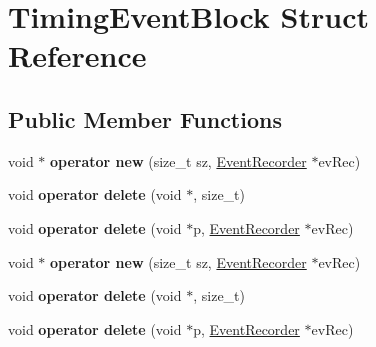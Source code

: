 \hypertarget{structTimingEventBlock}{\section{Timing\-Event\-Block Struct Reference}
\label{structTimingEventBlock}
}
\subsection*{Public Member Functions}
\begin{DoxyCompactItemize}
\item 
\hypertarget{structTimingEventBlock_a2893419c89b441b7eeac01931b46eb69}{void $\ast$ {\bfseries operator new} (size\-\_\-t sz, \hyperlink{classEventRecorder}{Event\-Recorder} $\ast$ev\-Rec)}\label{structTimingEventBlock_a2893419c89b441b7eeac01931b46eb69}

\item 
\hypertarget{structTimingEventBlock_a0e4e04137d8058df35f3de8a2d8f3909}{void {\bfseries operator delete} (void $\ast$, size\-\_\-t)}\label{structTimingEventBlock_a0e4e04137d8058df35f3de8a2d8f3909}

\item 
\hypertarget{structTimingEventBlock_a04d19b0eb1e02fb4d472c46ced7a2288}{void {\bfseries operator delete} (void $\ast$p, \hyperlink{classEventRecorder}{Event\-Recorder} $\ast$ev\-Rec)}\label{structTimingEventBlock_a04d19b0eb1e02fb4d472c46ced7a2288}

\item 
\hypertarget{structTimingEventBlock_a2893419c89b441b7eeac01931b46eb69}{void $\ast$ {\bfseries operator new} (size\-\_\-t sz, \hyperlink{classEventRecorder}{Event\-Recorder} $\ast$ev\-Rec)}\label{structTimingEventBlock_a2893419c89b441b7eeac01931b46eb69}

\item 
\hypertarget{structTimingEventBlock_a0e4e04137d8058df35f3de8a2d8f3909}{void {\bfseries operator delete} (void $\ast$, size\-\_\-t)}\label{structTimingEventBlock_a0e4e04137d8058df35f3de8a2d8f3909}

\item 
\hypertarget{structTimingEventBlock_a04d19b0eb1e02fb4d472c46ced7a2288}{void {\bfseries operator delete} (void $\ast$p, \hyperlink{classEventRecorder}{Event\-Recorder} $\ast$ev\-Rec)}\label{structTimingEventBlock_a04d19b0eb1e02fb4d472c46ced7a2288}

\end{DoxyCompactItemize}
